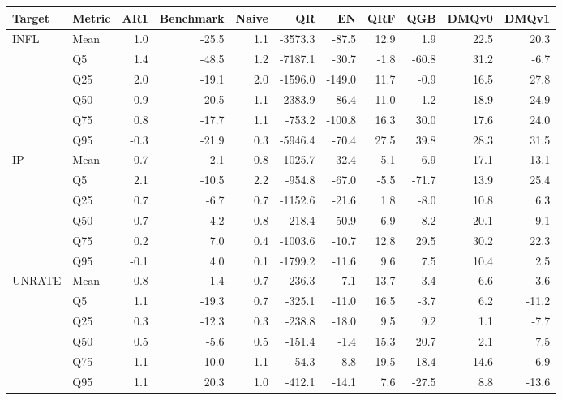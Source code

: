 \begin{tabular}{llrrrrrrrrr}
\toprule
Target & Metric & AR1 & Benchmark & Naive & QR & EN & QRF & QGB & DMQv0 & DMQv1 \\
\midrule
\multirow{6}{*}{INFL} & Mean & 1.0 & -25.5 & 1.1 & -3573.3 & -87.5 & 12.9 & 1.9 & 22.5 & 20.3 \\
 & Q5 & 1.4 & -48.5 & 1.2 & -7187.1 & -30.7 & -1.8 & -60.8 & 31.2 & -6.7 \\
 & Q25 & 2.0 & -19.1 & 2.0 & -1596.0 & -149.0 & 11.7 & -0.9 & 16.5 & 27.8 \\
 & Q50 & 0.9 & -20.5 & 1.1 & -2383.9 & -86.4 & 11.0 & 1.2 & 18.9 & 24.9 \\
 & Q75 & 0.8 & -17.7 & 1.1 & -753.2 & -100.8 & 16.3 & 30.0 & 17.6 & 24.0 \\
 & Q95 & -0.3 & -21.9 & 0.3 & -5946.4 & -70.4 & 27.5 & 39.8 & 28.3 & 31.5 \\
\midrule
\multirow{6}{*}{IP} & Mean & 0.7 & -2.1 & 0.8 & -1025.7 & -32.4 & 5.1 & -6.9 & 17.1 & 13.1 \\
 & Q5 & 2.1 & -10.5 & 2.2 & -954.8 & -67.0 & -5.5 & -71.7 & 13.9 & 25.4 \\
 & Q25 & 0.7 & -6.7 & 0.7 & -1152.6 & -21.6 & 1.8 & -8.0 & 10.8 & 6.3 \\
 & Q50 & 0.7 & -4.2 & 0.8 & -218.4 & -50.9 & 6.9 & 8.2 & 20.1 & 9.1 \\
 & Q75 & 0.2 & 7.0 & 0.4 & -1003.6 & -10.7 & 12.8 & 29.5 & 30.2 & 22.3 \\
 & Q95 & -0.1 & 4.0 & 0.1 & -1799.2 & -11.6 & 9.6 & 7.5 & 10.4 & 2.5 \\
\midrule
\multirow{6}{*}{UNRATE} & Mean & 0.8 & -1.4 & 0.7 & -236.3 & -7.1 & 13.7 & 3.4 & 6.6 & -3.6 \\
 & Q5 & 1.1 & -19.3 & 0.7 & -325.1 & -11.0 & 16.5 & -3.7 & 6.2 & -11.2 \\
 & Q25 & 0.3 & -12.3 & 0.3 & -238.8 & -18.0 & 9.5 & 9.2 & 1.1 & -7.7 \\
 & Q50 & 0.5 & -5.6 & 0.5 & -151.4 & -1.4 & 15.3 & 20.7 & 2.1 & 7.5 \\
 & Q75 & 1.1 & 10.0 & 1.1 & -54.3 & 8.8 & 19.5 & 18.4 & 14.6 & 6.9 \\
 & Q95 & 1.1 & 20.3 & 1.0 & -412.1 & -14.1 & 7.6 & -27.5 & 8.8 & -13.6 \\
\bottomrule
\end{tabular}
